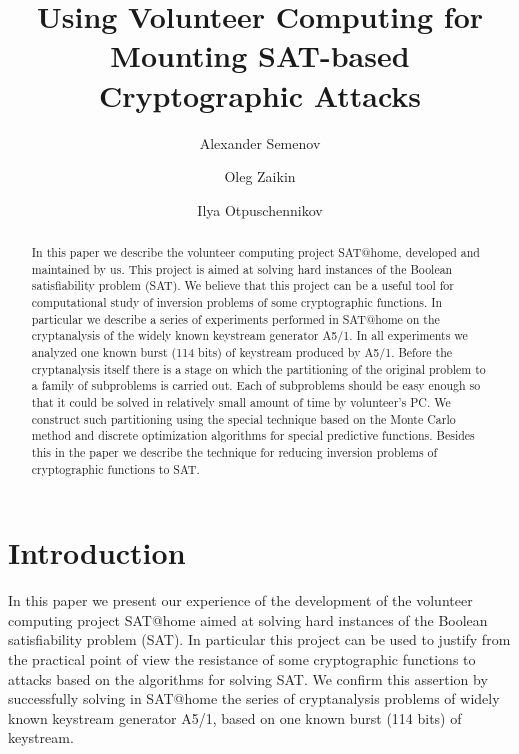 \documentclass[runningheads,a4paper]{llncs}
\begin{document}
\frontmatter          
{}
\pagestyle{headings}  
\title{Using Volunteer Computing for Mounting SAT-based Cryptographic Attacks}
\author{Alexander Semenov \and Oleg Zaikin \and Ilya Otpuschennikov}

\maketitle              
\begin{abstract}
In this paper we describe the volunteer computing project SAT@home, developed and maintained by us. This project is aimed at solving hard instances of the Boolean satisfiability problem (SAT). We believe that this project can be a useful tool for computational study of inversion problems of some cryptographic functions. In particular we describe a series of experiments performed in SAT@home on the cryptanalysis of the widely known keystream generator A5/1. In all experiments we analyzed one known burst (114 bits) of keystream produced by A5/1. Before the cryptanalysis itself there is a stage on which the partitioning of the original problem to a family of subproblems is carried out. Each of subproblems should be easy enough so that it could be solved in relatively small amount of time by volunteer's PC. We construct such partitioning using the special technique based on the Monte Carlo method and discrete optimization algorithms for special predictive functions. Besides this in the paper we describe the technique for reducing inversion problems of cryptographic functions to SAT.
\end{abstract}
\section{Introduction}

In this paper we present our experience of the development of the volunteer computing project SAT@home aimed at solving hard instances of the Boolean satisfiability problem (SAT). In particular this project can be used to justify from the practical point of view the resistance of some cryptographic functions to attacks based on the algorithms for solving SAT. We confirm this assertion by successfully solving in SAT@home the series of cryptanalysis problems of widely known keystream generator A5/1, based on one known burst (114 bits) of keystream. 
\end{document}
